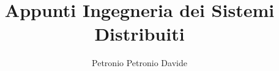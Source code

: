 \documentclass[12pt,a4paper,openany,oneside]{book}
\begin{document}


\title{Appunti Ingegneria dei Sistemi Distribuiti}
\author{Petronio Petronio Davide}


\tableofcontents


\newpage
{}

\end{document}
